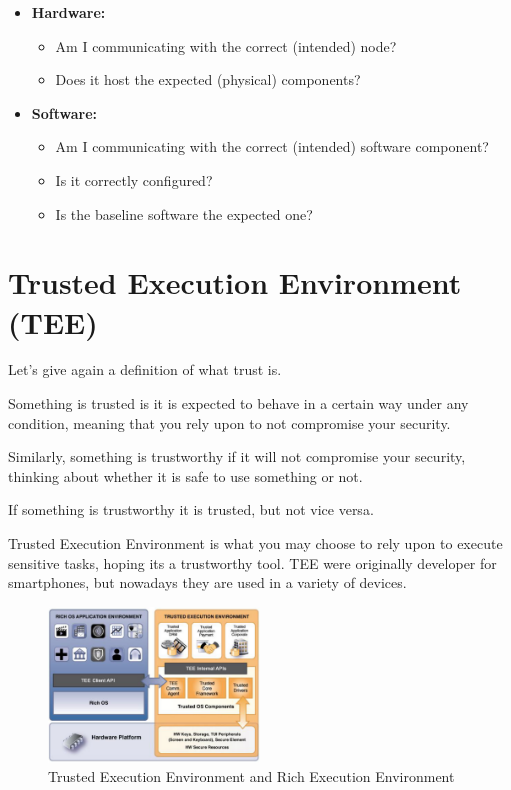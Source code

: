 \begin{itemize}
  \item \textbf{Hardware:}
    \begin{itemize}
      \item Am I communicating with the correct (intended) node?
      \item Does it host the expected (physical) components?
    \end{itemize}
  \item \textbf{Software:}
    \begin{itemize}
      \item Am I communicating with the correct (intended) 
        software component?
      \item Is it correctly configured?
      \item Is the baseline software the expected one?
    \end{itemize}
\end{itemize}

\section{Trusted Execution Environment (TEE)}
Let's give again a definition of what trust is.
\begin{boxH}
  Something is trusted is it is expected to behave in a certain way
  under any condition, meaning that you rely upon to not compromise
  your security.
\end{boxH}

Similarly, something is trustworthy if it will not compromise your
security, thinking about whether it is safe to use something or not.

If something is trustworthy it is trusted, but not vice versa.

Trusted Execution Environment is what you may choose to rely upon to
execute sensitive tasks, hoping its a trustworthy tool. TEE were
originally developer for smartphones, but nowadays they are used in 
a variety of devices.

\begin{figure}[H]
  \centering
  \includegraphics[width=0.5\textwidth]{img/Tee and REE.png}
  \caption{Trusted Execution Environment and Rich Execution
  Environment}
\end{figure}

